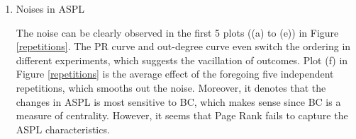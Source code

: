 \documentclass{article}
\begin{document}
\begin{enumerate}
\item Noises in ASPL\\

\par The noise can be clearly observed in the first 5 plots ((a) to (e)) in Figure \ref{repetitions}. The PR curve and out-degree curve even switch the ordering in different experiments, which suggests the vacillation of outcomes.  Plot (f) in Figure  \ref{repetitions} is the average effect of the foregoing five independent repetitions, which smooths out the noise. Moreover, it denotes that the changes in ASPL is most sensitive to BC, which makes sense since BC is a measure of centrality. However, it seems that Page Rank fails to capture the ASPL characteristics. \\


\end{enumerate}
\end{document}
